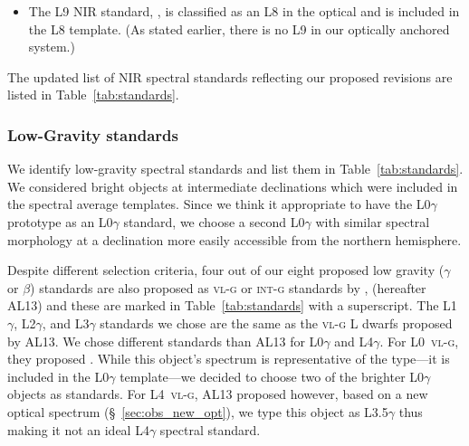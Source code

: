 \documentclass[12pt,preprint]{aastex}
\begin{document}
\begin{itemize}
	\item The L9 NIR standard, , is classified as an L8 in the optical and is included in the L8 template. (As stated earlier, there is no L9 in our optically anchored system.)

\end{itemize}

The updated list of NIR spectral standards reflecting our proposed revisions are listed in Table~\ref{tab:standards}.

\subsubsection{Low-Gravity standards}

We identify low-gravity spectral standards and list them in Table~\ref{tab:standards}.
We considered bright objects at intermediate declinations which were included in the spectral average templates.
Since we think it appropriate to have the L0$\gamma$ prototype  as an L0$\gamma$ standard, we choose a second L0$\gamma$ with similar spectral morphology at a declination more easily accessible from the northern hemisphere.

Despite different selection criteria, four out of our eight proposed low gravity ($\gamma$ or $\beta$) standards are also proposed as \textsc{vl-g} or \textsc{int-g} standards by \citet{Allers:2013hk}, (hereafter AL13) and these are marked in Table~\ref{tab:standards} with a superscript.
The L1$\gamma$, L2$\gamma$, and L3$\gamma$ standards we chose are the same as the \textsc{vl-g} L dwarfs proposed by AL13.
We chose different standards than AL13 for L0$\gamma$ and L4$\gamma$.
For L0~\textsc{vl-g}, they proposed . While this object's spectrum is representative of the type---it is included in the L0$\gamma$ template---we decided to choose two of the brighter L0$\gamma$ objects as standards.
For L4~\textsc{vl-g}, AL13 proposed  however, based on a new optical spectrum (\S~\ref{sec:obs_new_opt}), we type this object as L3.5$\gamma$ thus making it not an ideal L4$\gamma$ spectral standard.
\end{document}
